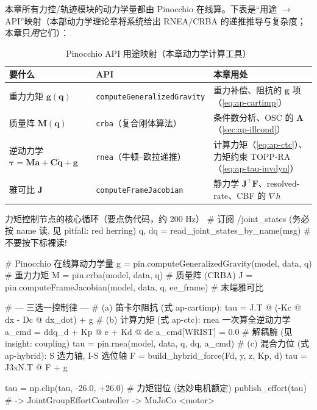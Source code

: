 本章所有力控/轨迹模块的动力学量都由 Pinocchio 在线算。下表是“用途 $\to$ API”映射（本部动力学理论章将系统给出 RNEA/CRBA 的递推推导与复杂度；本章只\emph{用}它们）：

\begin{table}[H]\centering\small
\caption{Pinocchio API 用途映射（本章动力学计算工具）}
\begin{tabular}{p{} p{} p{}}
\toprule
要什么 & API & 本章用处 \\
\midrule
重力力矩 $\mathbf{g}(\mathbf{q})$ & \texttt{computeGeneralizedGravity} & 重力补偿、阻抗的 $\mathbf{g}$ 项（\cref{eq:ap-cartimp}）\\
质量阵 $\mathbf{M}(\mathbf{q})$ & \texttt{crba}（复合刚体算法）& 条件数分析、OSC 的 $\boldsymbol{\Lambda}$（\cref{sec:ap-illcond}）\\
逆动力学 $\boldsymbol{\tau}=\mathbf{M}\mathbf{a}+\mathbf{C}\dot{\mathbf{q}}+\mathbf{g}$ & \texttt{rnea}（牛顿--欧拉递推）& 计算力矩（\cref{eq:ap-ctc}）、力矩约束 TOPP-RA（\cref{eq:ap-tau-invdyn}）\\
雅可比 $\mathbf{J}$ & \texttt{computeFrameJacobian} & 静力学 $\mathbf{J}^\top\mathbf{F}$、resolved-rate、CBF 的 $\nabla h$ \\
\bottomrule
\end{tabular}
\label{tab:ap-pinocchio}
\end{table}

\begin{codebox}[Python]{力矩控制节点的核心循环（要点伪代码，约 200 Hz）}
# 订阅 /joint_states (务必按 name 读, 见 pitfall: red herring)
q, dq = read_joint_states_by_name(msg)        # 不要按下标裸读!

# Pinocchio 在线算动力学量
g = pin.computeGeneralizedGravity(model, data, q)        # 重力力矩
M = pin.crba(model, data, q)                             # 质量阵 (CRBA)
J = pin.computeFrameJacobian(model, data, q, ee_frame)   # 末端雅可比

# --- 三选一控制律 ---
# (a) 笛卡尔阻抗 (式 ap-cartimp):
tau = J.T @ (-Kc @ dx - Dc @ dx_dot) + g
# (b) 计算力矩 (式 ap-ctc): rnea 一次算全逆动力学
a_cmd = ddq_d + Kp @ e + Kd @ de
a_cmd[WRIST] = 0.0                            # 解耦腕 (见 insight: coupling)
tau = pin.rnea(model, data, q, dq, a_cmd)
# (c) 混合力位 (式 ap-hybrid): S 选力轴, I-S 选位轴
F = build_hybrid_force(Fd, y, z, Kp, d)
tau = J3xN.T @ F + g

tau = np.clip(tau, -26.0, +26.0)             # 力矩钳位 (达妙电机额定)
publish_effort(tau)                           # -> JointGroupEffortController -> MuJoCo <motor>
\end{codebox}

